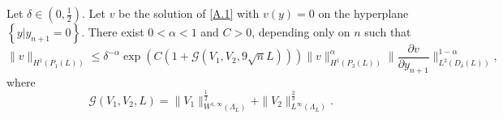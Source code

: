 \begin{lemma}
	Let $ \delta \in \left( 0,\frac{1}{2} \right) $. Let $v$ be the solution of \cref{A.1} with $v(y)=0$ on the hyperplane $\left\{y|y_{n+1}=0\right\} $. There exist $0<\alpha <1$ and $C>0$, depending only on $n$ such that
	\begin{equation}
		\|v\|_{H^{1}\left( P_1(L) \right) }\le \delta^{-\alpha }\exp \left( C\left( 1+\mathcal{G}\left( V_1,V_2,9\sqrt{n} L \right)  \right)  \right) \|v\|^{\alpha }_{H^{1}\left( P_3(L) \right) }\|\frac{\partial v}{\partial y_{n+1}}\|^{1-\alpha }_{L^2\left( D_\delta\left( L \right)  \right) },
	\end{equation}
	where
	\begin{equation}
		\mathcal{G}\left( V_1,V_2,L \right) =\|V_1\|_{W^{1,\infty}\left( \Lambda_L \right) }^{\frac{1}{2}}+\|V_2\|^{\frac{2}{3}}_{L^{\infty}\left( \Lambda_L \right) }.
	\end{equation}
\end{lemma}
\fi


